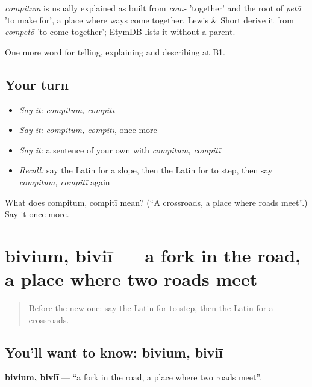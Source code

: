 \begin{cousinweb}
\emph{compitum} is usually explained as built from \emph{com-} 'together' and the root of \emph{petō} 'to make for', a place where ways come together. Lewis \& Short derive it from \emph{competō} 'to come together'; EtymDB lists it without a parent.
\end{cousinweb}

\begin{grammarlens}[title={What you've built}]
One more word for telling, explaining and describing at B1.
\end{grammarlens}

\subsection*{Your turn}
\begin{itemize}
\raggedright
  \item \emph{Say it:} \emph{compitum, compitī}
  \item \emph{Say it:} \emph{compitum, compitī}, once more
  \item \emph{Say it:} a sentence of your own with \emph{compitum, compitī}
  \item \emph{Recall:} say the Latin for a slope, then the Latin for to step, then say \emph{compitum, compitī} again
\end{itemize}

\begin{tcolorbox}[breakable,colback=teal!4,colframe=teal!35!black,title={Before you move on}]
What does compitum, compitī mean? (\textquotedblleft{}A crossroads, a place where roads meet\textquotedblright{}.) Say it once more.
\end{tcolorbox}
\section[bivium, biviī]{bivium, biviī — a fork in the road, a place where two roads meet}

\label{lesson:LA-C424-bivium}



\begin{quote}
Before the new one: say the Latin for to step, then the Latin for a crossroads.
\end{quote}

\subsection*{You'll want to know: bivium, biviī}
\textbf{bivium, biviī} — \textquotedblleft{}a fork in the road, a place where two roads meet\textquotedblright{}.

